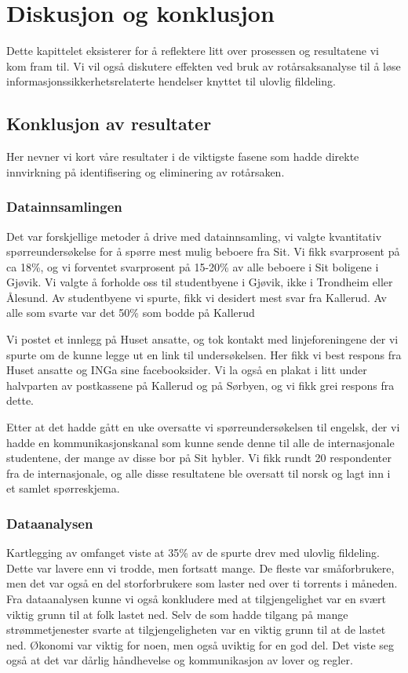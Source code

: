 \chapter{Diskusjon og konklusjon}
Dette kapittelet eksisterer for å reflektere litt over prosessen og resultatene vi kom fram til. Vi vil også diskutere effekten ved bruk av rotårsaksanalyse til å løse informasjonssikkerhetsrelaterte hendelser knyttet til ulovlig fildeling. 

\section{Konklusjon av resultater}
Her nevner vi kort våre resultater i de viktigste fasene som hadde direkte innvirkning på identifisering og eliminering av rotårsaken. 

\subsection{Datainnsamlingen}
Det var forskjellige metoder å drive med datainnsamling, vi valgte kvantitativ spørreundersøkelse for å spørre mest mulig beboere fra Sit. Vi fikk svarprosent på ca 18\%, og vi forventet svarprosent på 15-20\% av alle beboere i Sit boligene i Gjøvik. Vi valgte å forholde oss til studentbyene i Gjøvik, ikke i Trondheim eller Ålesund. Av studentbyene vi spurte, fikk vi desidert mest svar fra Kallerud. Av alle som svarte var det 50\% som bodde på Kallerud

Vi postet et innlegg på Huset ansatte, og tok kontakt med linjeforeningene der vi spurte om de kunne legge ut en link til undersøkelsen. Her fikk vi best respons fra Huset ansatte og INGa sine facebooksider. Vi la også en plakat i litt under halvparten av postkassene på Kallerud og på Sørbyen, og vi fikk grei respons fra dette.

Etter at det hadde gått en uke oversatte vi spørreundersøkelsen til engelsk, der vi hadde en kommunikasjonskanal som kunne sende denne til alle de internasjonale studentene, der mange av disse bor på Sit hybler. Vi fikk rundt 20 respondenter fra de internasjonale, og alle disse resultatene ble oversatt til norsk og lagt inn i et samlet spørreskjema.


\subsection{Dataanalysen}
Kartlegging av omfanget viste at 35\% av de spurte drev med ulovlig fildeling. Dette var lavere enn vi trodde, men fortsatt mange. De fleste var småforbrukere, men det var også en del storforbrukere som laster ned over ti torrents i måneden. Fra dataanalysen kunne vi også konkludere med at tilgjengelighet var en svært viktig grunn til at folk lastet ned. Selv de som hadde tilgang på mange strømmetjenester svarte at tilgjengeligheten var en viktig grunn til at de lastet ned. Økonomi var viktig for noen, men også uviktig for en god del. Det viste seg også at det var dårlig håndhevelse og kommunikasjon av lover og regler. 

